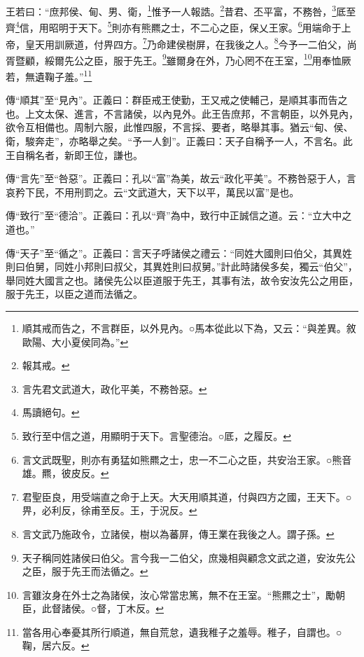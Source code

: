 王若曰：“庶邦侯、甸、男、衛，\footnote{順其戒而告之，不言群臣，以外見內。○馬本從此以下為，又云：“與差異。敘歐陽、大小夏侯同為。”}惟予一人報誥。\footnote{報其戒。}昔君、丕平富，不務咎，\footnote{言先君文武道大，政化平美，不務咎惡。}厎至齊\footnote{馬讀絕句。}信，用昭明于天下。\footnote{致行至中信之道，用顯明于天下。言聖德治。○厎，之履反。}則亦有熊羆之士，不二心之臣，保乂王家。\footnote{言文武既聖，則亦有勇猛如熊羆之士，忠一不二心之臣，共安治王家。○熊音雄。羆，彼皮反。}用端命于上帝，皇天用訓厥道，付畀四方。\footnote{君聖臣良，用受端直之命于上天。大天用順其道，付與四方之國，王天下。○畀，必利反，徐甫至反。王，于況反。}乃命建侯樹屏，在我後之人。\footnote{言文武乃施政令，立諸侯，樹以為蕃屏，傳王業在我後之人。謂子孫。}今予一二伯父，尚胥暨顧，綏爾先公之臣，服于先王。\footnote{天子稱同姓諸侯曰伯父。言今我一二伯父，庶幾相與顧念文武之道，安汝先公之臣，服于先王而法循之。}雖爾身在外，乃心罔不在王室，\footnote{言雖汝身在外士之為諸侯，汝心常當忠篤，無不在王室。“熊羆之士”，勵朝臣，此督諸侯。○督，丁木反。}用奉恤厥若，無遺鞠子羞。”\footnote{當各用心奉憂其所行順道，無自荒怠，遺我稚子之羞辱。稚子，自謂也。○鞠，居六反。}


{\noindent\zhuan{}\fzbyks 傳“順其”至“見內”。正義曰：群臣戒王使勤，王又戒之使輔己，是順其事而告之也。上文太保、進言，不言諸侯，以內見外。此王告庶邦，不言朝臣，以外見內，欲令互相備也。周制六服，此惟四服，不言採、要者，略舉其事。猶云“甸、侯、衛，駿奔走”，亦略舉之矣。“予一人釗”。正義曰：天子自稱予一人，不言名。此王自稱名者，新即王位，謙也。 \par}

{\noindent\zhuan{}\fzbyks 傳“言先”至“咎惡”。正義曰：孔以“富”為美，故云“政化平美”。不務咎惡于人，言哀矜下民，不用刑罰之。云“文武道大，天下以平，萬民以富”是也。 \par}

{\noindent\zhuan{}\fzbyks 傳“致行”至“德洽”。正義曰：孔以“齊”為中，致行中正誠信之道。云：“立大中之道也。” \par}

{\noindent\zhuan{}\fzbyks 傳“天子”至“循之”。正義曰：言天子呼諸侯之禮云：“同姓大國則曰伯父，其異姓則曰伯舅，同姓小邦則曰叔父，其異姓則曰叔舅。”計此時諸侯多矣，獨云“伯父”，舉同姓大國言之也。諸侯先公以臣道服于先王，其事有法，故令安汝先公之用臣，服于先王，以臣之道而法循之。 \par}

